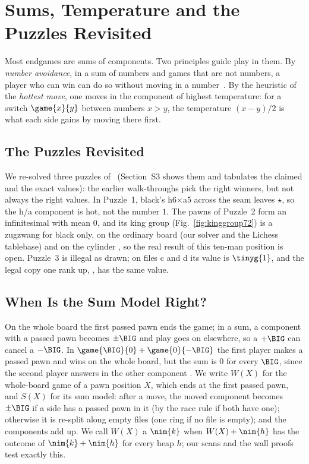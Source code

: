 \section{Sums, Temperature and the Puzzles Revisited}\label{sec:sums}

Most endgames are sums of components. Two principles guide play in them. By \emph{number avoidance}, in a sum of
numbers and games that are not numbers, a player who can win can do so without moving in a
number~\cite{WinningWays,Siegel2013}. By the heuristic of the \emph{hottest move}, one moves in the component of
highest temperature: for a switch $\game{x}{y}$ between numbers $x>y$, the temperature $(x-y)/2$ is what each
side gains by moving there first.

\subsection{The Puzzles Revisited}

We re-solved three puzzles of~\cite{Study2025} (Section~S3 shows them and tabulates the claimed and the exact
values): the earlier walk-throughs pick the right winners, but not always the right values. In Puzzle~1, black's
h6$\times$a5 across the seam leaves $\star$, so the h/a component is hot, not the number $1$. The
pawns of Puzzle~2 form an infinitesimal with mean $0$, and its king group (Fig.~\ref{fig:kinggroup72}) is a
zugzwang for black only, on the ordinary board  (our solver and the Lichess tablebase) and on the
cylinder , so the real result of this ten-man position is open. Puzzle~3 is illegal as drawn; on files c and d its value is $\tinyg{1}$, and the legal copy
one rank up, , has the same value.

\subsection{When Is the Sum Model Right?}\label{sec:sums-hss}

On the whole board the first passed pawn ends the game; in a sum, a component with a passed pawn becomes $\pm\BIG$ and
play goes on elsewhere, so a $+\BIG$ can cancel a $-\BIG$. In $\game{\BIG}{0}+\game{0}{-\BIG}$ the first player
makes a passed pawn and wins on the whole board, but the sum is $0$ for every $\BIG$, since the second player
answers in the other component . We write $W(X)$ for the whole-board game of a pawn position $X$, which
ends at the first passed pawn, and $S(X)$ for its sum model: after a move, the moved component becomes $\pm\BIG$ if a side has a
passed pawn in it (by the race rule if both have one); otherwise it is re-split along empty files
(one ring if no file is empty); and the components add up. We call $W(X)$ a $\nim{k}$ when
$W(X)+\nim{h}$ has the outcome of $\nim{k}+\nim{h}$ for every heap $h$; our scans and the wall proofs test
exactly this.

